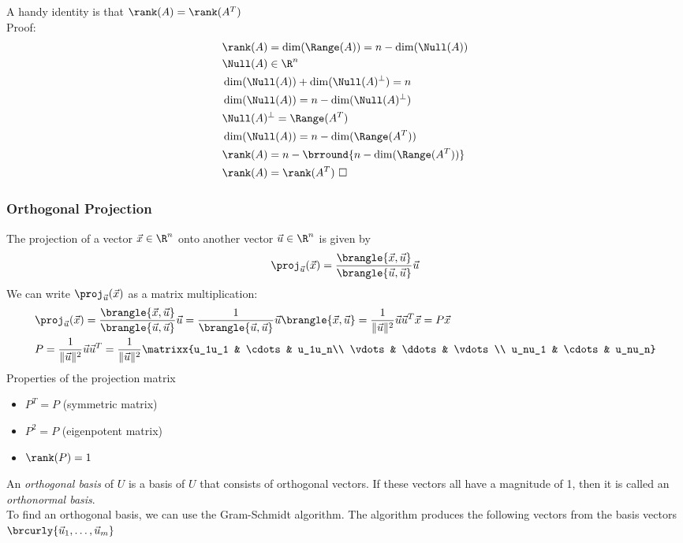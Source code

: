 A handy identity is that $\rank(A)=\rank(A^T)$\\
Proof:
\begin{align*}
    &\rank(A)=\dim(\Range(A))=n-\dim(\Null(A))\\
    &\Null(A)\in\R^n\\
    &\dim(\Null(A))+\dim(\Null(A)^\perp)=n\\
    &\dim(\Null(A))=n-\dim(\Null(A)^\perp)\\
    &\Null(A)^\perp=\Range(A^T)\\
    &\dim(\Null(A))=n-\dim(\Range(A^T))\\
    &\rank(A)=n-\brround{n-\dim(\Range(A^T))}\\
    &\rank(A)=\rank(A^T)\ \square
\end{align*}
\subsubsection{Orthogonal Projection}
The projection of a vector $\vec{x}\in\R^n$ onto another vector $\vec{u}\in\R^n$ is given by
$$\proj_{\vec{u}}(\vec{x})=\frac{\brangle{\vec{x},\vec{u}}}{\brangle{\vec{u},\vec{u}}}\vec{u}$$
We can write $\proj_{\vec{u}}(\vec{x})$ as a matrix multiplication:
\begin{align*}
    &\proj_{\vec{u}}(\vec{x})=\frac{\brangle{\vec{x},\vec{u}}}{\brangle{\vec{u},\vec{u}}}\vec{u}=\frac{1}{\brangle{\vec{u},\vec{u}}}\vec{u}\brangle{\vec{x},\vec{u}}=\frac{1}{\|\vec{u}\|^2}\vec{u}\vec{u}^T\vec{x}=P\vec{x}\\
    &P=\frac{1}{\|\vec{u}\|^2}\vec{u}\vec{u}^T=\frac{1}{\|\vec{u}\|^2}\matrixx{u_1u_1 & \cdots & u_1u_n\\ \vdots & \ddots & \vdots\\ u_nu_1 & \cdots & u_nu_n}
\end{align*}
Properties of the projection matrix
\begin{itemize}
    \item $P^T=P$ (symmetric matrix)
    \item $P^2=P$ (eigenpotent matrix)
    \item $\rank(P)=1$
\end{itemize}
An \textit{orthogonal basis} of $U$ is a basis of $U$ that consists of orthogonal vectors. If these vectors all have a magnitude of 1, then it is called an \textit{orthonormal basis}.\\
To find an orthogonal basis, we can use the Gram-Schmidt algorithm. The algorithm produces the following vectors from the basis vectors $\brcurly{\vec{u}_1,\ldots,\vec{u}_m}$
